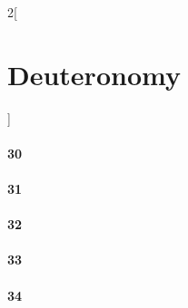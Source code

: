 \documentclass{book}
\begin{document}
\begin{multicols}{2}[\part{Deuteronomy}]
\subsection*{30}
\subsection*{31}
\subsection*{32}
\subsection*{33}
\subsection*{34}
\end{multicols}
\end{document}
